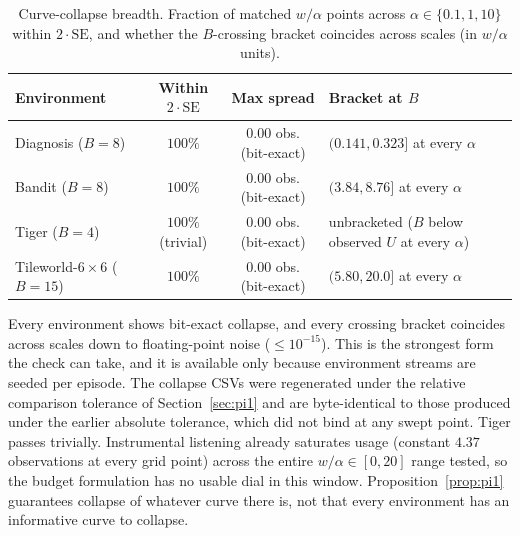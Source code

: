 \begin{table}[t]
\centering
\caption{Curve-collapse breadth. Fraction of matched $w/\alpha$ points across $\alpha \in \{0.1,1,10\}$ within $2\cdot\mathrm{SE}$, and whether the $B$-crossing bracket coincides across scales (in $w/\alpha$ units).}
\label{tab:collapse-breadth}
\tablefontsize
\begin{tabular}{lccp{3.3cm}}
\toprule
Environment & \shortstack{Within\\$2\cdot\mathrm{SE}$} & Max spread & Bracket at $B$ \\
\midrule
\shortstack[l]{Diagnosis\\($B{=}8$)} & $100\%$ & \shortstack{$0.00$ obs.\\(bit-exact)} & $(0.141, 0.323]$ at every $\alpha$ \\
\shortstack[l]{Bandit\\($B{=}8$)} & $100\%$ & \shortstack{$0.00$ obs.\\(bit-exact)} & $(3.84, 8.76]$ at every $\alpha$ \\
\shortstack[l]{Tiger\\($B{=}4$)} & $100\%$ (trivial) & \shortstack{$0.00$ obs.\\(bit-exact)} & unbracketed ($B$ below observed $U$ at every $\alpha$) \\
\shortstack[l]{Tileworld-$6{\times}6$\\($B{=}15$)} & $100\%$ & \shortstack{$0.00$ obs.\\(bit-exact)} & $(5.80, 20.0]$ at every $\alpha$ \\
\bottomrule
\end{tabular}
\end{table}

Every environment shows bit-exact collapse, and every crossing bracket coincides across scales down to floating-point noise ($\le 10^{-15}$). This is the strongest form the check can take, and it is available only because environment streams are seeded per episode. The collapse CSVs were regenerated under the relative comparison tolerance of Section~\ref{sec:pi1} and are byte-identical to those produced under the earlier absolute tolerance, which did not bind at any swept point. Tiger passes trivially. Instrumental listening already saturates usage (constant $4.37$ observations at every grid point) across the entire $w/\alpha \in [0,20]$ range tested, so the budget formulation has no usable dial in this window. Proposition~\ref{prop:pi1} guarantees collapse of whatever curve there is, not that every environment has an informative curve to collapse.

